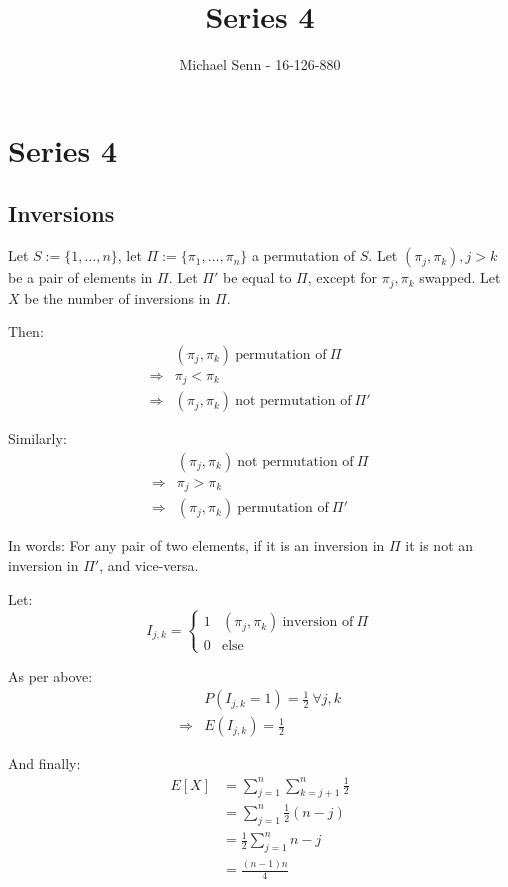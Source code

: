 \documentclass[a4paper]{scrreprt}
\title{Series 4}
\author{Michael Senn \maillink{michael.senn@students.unibe.ch} - 16-126-880}
\date{\printdate}
\begin{document}
\maketitle


\setcounter{chapter}{3}
\chapter{Series 4}

\section{Inversions}

Let $S := \{1, \ldots, n\}$, let $\Pi := \{\pi_1, \ldots, \pi_n\}$ a
permutation of $S$. Let $(\pi_j, \pi_k), j > k$ be a pair of elements in
$\Pi$. Let $\Pi'$ be equal to $\Pi$, except for $\pi_j, \pi_k$ swapped. Let $X$
be the number of inversions in $\Pi$.

Then:
\begin{align*}
	& (\pi_j, \pi_k)\ \text{permutation of}\ \Pi \\
	\Rightarrow & \pi_j < \pi_k \\
	\Rightarrow & (\pi_j, \pi_k)\ \text{not permutation of}\ \Pi'
\end{align*}

Similarly:
\begin{align*}
	& (\pi_j, \pi_k)\ \text{not permutation of}\ \Pi \\
	\Rightarrow & \pi_j > \pi_k \\
	\Rightarrow & (\pi_j, \pi_k)\ \text{permutation of}\ \Pi'
\end{align*}

In words: For any pair of two elements, if it is an inversion in $\Pi$ it is
not an inversion in $\Pi'$, and vice-versa.

Let:
\[
	I_{j,k} =
	\begin{cases}
		1 & (\pi_j, \pi_k)\ \text{inversion of}\ \Pi \\
		0 & \text{else}
	\end{cases}
\]

As per above:
\begin{align*}
	& P(I_{j, k} = 1) = \frac{1}{2}\ \forall j, k \\
	\Rightarrow & E(I_{j, k}) = \frac{1}{2}
\end{align*}

And finally:
\begin{align*}
	E[X] & = \sum_{j=1}^n{\sum_{k=j+1}^n{\frac{1}{2}}} \\
	& = \sum_{j=1}^n{\frac{1}{2} (n-j)} \\
	& = \frac{1}{2} \sum_{j=1}^n{n-j} \\
	& = \frac{(n-1) n}{4}
\end{align*}
\end{document}
